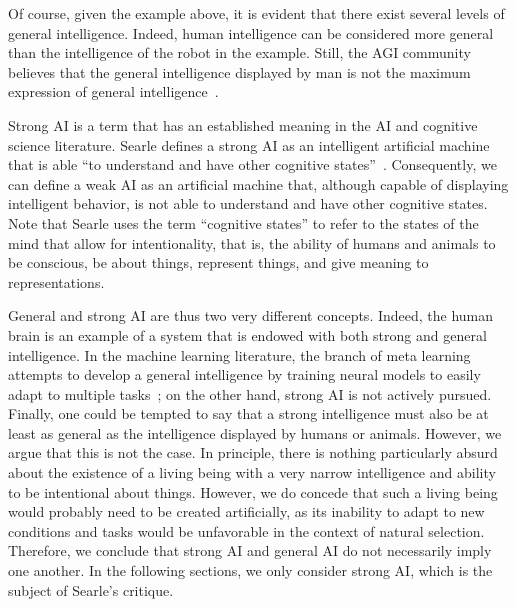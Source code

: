 Of course, given the example above, it is evident that there exist several levels of general intelligence. Indeed, human intelligence can be considered more general than the intelligence of the robot in the example. Still, the AGI community believes that the general intelligence displayed by man is not the maximum expression of general intelligence~\cite{goertzel2014artificial}.

Strong AI is a term that has an established meaning in the AI and cognitive science literature. Searle defines a strong AI as an intelligent artificial machine that is able ``to understand and have other cognitive states''~\cite[p.~417]{searle1980minds}. Consequently, we can define a weak AI as an artificial machine that, although capable of displaying intelligent behavior, is not able to understand and have other cognitive states. Note that Searle uses the term ``cognitive states'' to refer to the states of the mind that allow for intentionality, that is, the ability of humans and animals to be conscious, be about things, represent things, and give meaning to representations.

General and strong AI are thus two very different concepts. Indeed, the human brain is an example of a system that is endowed with both strong and general intelligence. In the machine learning literature, the branch of meta learning attempts to develop a general intelligence by training neural models to easily adapt to multiple tasks~\cite{hospedales2020meta}; on the other hand, strong AI is not actively pursued. Finally, one could be tempted to say that a strong intelligence must also be at least as general as the intelligence displayed by humans or animals. However, we argue that this is not the case. In principle, there is nothing particularly absurd about the existence of a living being with a very narrow intelligence and ability to be intentional about things. However, we do concede that such a living being would probably need to be created artificially, as its inability to adapt to new conditions and tasks would be unfavorable in the context of natural selection. Therefore, we conclude that strong AI and general AI do not necessarily imply one another. In the following sections, we only consider strong AI, which is the subject of Searle's critique.
